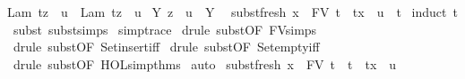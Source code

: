 \begin{isabellebody}
{\isachardoublequoteopen}{\isacharparenleft}Lam\ t{\isacharparenright}{\isacharbrackleft}z\ {\isacharcolon}{\isacharcolon}{\isacharequal}\ u{\isacharbrackright}\ {\isacharequal}\ Lam\ {\isacharparenleft}t{\isacharbrackleft}z\ {\isacharcolon}{\isacharcolon}{\isacharequal}\ u{\isacharbrackright}{\isacharparenright}{\isachardoublequoteclose}\ {\isacharbar}\isanewline
{\isachardoublequoteopen}{\isacharparenleft}Y\ {\isasymsigma}{\isacharparenright}{\isacharbrackleft}z\ {\isacharcolon}{\isacharcolon}{\isacharequal}\ u{\isacharbrackright}\ {\isacharequal}\ {\isacharparenleft}Y\ {\isasymsigma}{\isacharparenright}{\isachardoublequoteclose}\isanewline
\isanewline
{}\isamarkupfalse%
\ subst{\isacharunderscore}fresh{\isacharcolon}\ {\isachardoublequoteopen}x\ {\isasymnotin}\ FV\ t\ {\isasymLongrightarrow}\ t{\isacharbrackleft}x\ {\isacharcolon}{\isacharcolon}{\isacharequal}\ u{\isacharbrackright}\ {\isacharequal}\ t{\isachardoublequoteclose}\isanewline
%
\isadelimproof
%
\endisadelimproof
%
\isatagproof
{}\isamarkupfalse%
\ {\isacharparenleft}induct\ t{\isacharparenright}\isanewline
{}\isamarkupfalse%
\ {\isacharparenleft}subst\ subst{\isachardot}simps{\isacharparenleft}{}{\isacharparenright}{\isacharparenright}\isanewline
{}\isamarkupfalse%
\ {\isacharbrackleft}{\isacharbrackleft}simp{\isacharunderscore}trace{\isacharbrackright}{\isacharbrackright}\isanewline
{}\isamarkupfalse%
\ {\isacharparenleft}drule\ subst{\isacharbrackleft}OF\ FV{\isachardot}simps{\isacharparenleft}{}{\isacharparenright}{\isacharbrackright}{\isacharparenright}\isanewline
{}\isamarkupfalse%
\ {\isacharparenleft}drule\ subst{\isacharbrackleft}OF\ Set{\isachardot}insert{\isacharunderscore}iff{\isacharbrackright}{\isacharparenright}\isanewline
{}\isamarkupfalse%
\ {\isacharparenleft}drule\ subst{\isacharbrackleft}OF\ Set{\isachardot}empty{\isacharunderscore}iff{\isacharbrackright}{\isacharparenright}\isanewline
{}\isamarkupfalse%
\ {\isacharparenleft}drule\ subst{\isacharbrackleft}OF\ HOL{\isachardot}simp{\isacharunderscore}thms{\isacharparenleft}{}{}{\isacharparenright}{\isacharbrackright}{\isacharparenright}\isanewline
{}\isamarkupfalse%
\ auto%
\endisatagproof
{\isafoldproof}%
%
\isadelimproof
\isanewline
%
\endisadelimproof
\isanewline
{}\isamarkupfalse%
\ subst{\isacharunderscore}fresh{}{\isacharcolon}\ {\isachardoublequoteopen}x\ {\isasymnotin}\ FV\ t\ {\isasymLongrightarrow}\ t\ {\isacharequal}\ t{\isacharbrackleft}x\ {\isacharcolon}{\isacharcolon}{\isacharequal}\ u{\isacharbrackright}{\isachardoublequoteclose}\isanewline

\end{isabellebody}
